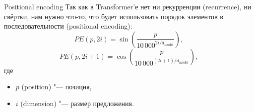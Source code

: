 \begin{frame}[fragile]{Positional encoding}%
  Так как в Transformer'е нет ни рекурренции (recurrence), ни свёртки, нам нужно что-то, что будет использовать порядок элементов в последовательности (positional encoding):
  \begin{equation}\label{positional-encoding}%
    PE(p, 2i) = \sin\left( \frac{p}{10\,000^{2i / d_{\text{model}}}} \right),
  \end{equation}
  \begin{equation}\label{positional-encoding-2}%
    PE(p, 2i + 1) = \cos\left( \frac{p}{10\,000^{(2i + 1) / d_{\text{model}}}} \right),
  \end{equation}
  где
  \begin{itemize}%
    \item $p$ (position) "--- позиция,
    \item $i$ (dimension) "--- размер предложения.
  \end{itemize}
\end{frame}

